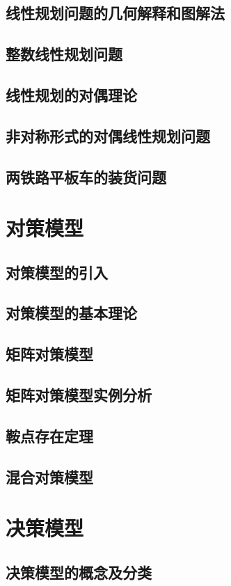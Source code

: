 \documentclass[openany]{progbookcn}
\begin{document}
\section{线性规划问题的几何解释和图解法}
\section{整数线性规划问题}
\section{线性规划的对偶理论}
\section{非对称形式的对偶线性规划问题}
\section{两铁路平板车的装货问题}

\chapter{对策模型}
\section{对策模型的引入}
\section{对策模型的基本理论}
\section{矩阵对策模型}
\section{矩阵对策模型实例分析}
\section{鞍点存在定理}
\section{混合对策模型}

\chapter{决策模型}
\section{决策模型的概念及分类}
\end{document}
